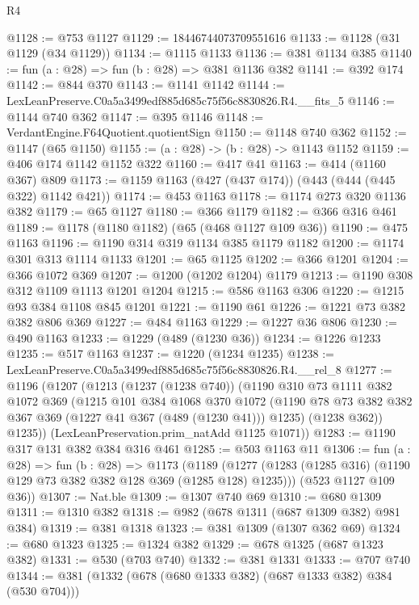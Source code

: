 \begin{lexlean}{R4}
\begin{coremodule}
@1128 := @753 @1127
@1129 := 18446744073709551616
@1133 := @1128 (@31 @1129 (@34 @1129))
@1134 := @1115 @1133
@1136 := @381 @1134 @385
@1140 := fun (a : @28) => fun (b : @28) => @381 @1136 @382
@1141 := @392 @174
@1142 := @844 @370
@1143 := @1141 @1142
@1144 := LexLeanPreserve.C0a5a3499edf885d685c75f56c8830826.R4.__fits_5
@1146 := @1144 @740 @362
@1147 := @395 @1146
@1148 := VerdantEngine.F64Quotient.quotientSign
@1150 := @1148 @740 @362
@1152 := @1147 (@65 @1150)
@1155 := (a : @28) -> (b : @28) -> @1143 @1152
@1159 := @406 @174 @1142 @1152 @322
@1160 := @417 @41
@1163 := @414 (@1160 @367) @809
@1173 := @1159 @1163 (@427 (@437 @174)) (@443 (@444 (@445 @322) @1142 @421))
@1174 := @453 @1163
@1178 := @1174 @273 @320 @1136 @382
@1179 := @65 @1127
@1180 := @366 @1179
@1182 := @366 @316 @461
@1189 := @1178 (@1180 @1182) (@65 (@468 @1127 @109 @36))
@1190 := @475 @1163
@1196 := @1190 @314 @319 @1134 @385 @1179 @1182
@1200 := @1174 @301 @313 @1114 @1133
@1201 := @65 @1125
@1202 := @366 @1201
@1204 := @366 @1072 @369
@1207 := @1200 (@1202 @1204) @1179
@1213 := @1190 @308 @312 @1109 @1113 @1201 @1204
@1215 := @586 @1163 @306
@1220 := @1215 @93 @384 @1108 @845 @1201
@1221 := @1190 @61
@1226 := @1221 @73 @382 @382 @806 @369
@1227 := @484 @1163
@1229 := @1227 @36 @806
@1230 := @490 @1163
@1233 := @1229 (@489 (@1230 @36))
@1234 := @1226 @1233
@1235 := @517 @1163
@1237 := @1220 (@1234 @1235)
@1238 := LexLeanPreserve.C0a5a3499edf885d685c75f56c8830826.R4.__rel_8
@1277 := @1196
    (@1207
      (@1213
        (@1237 (@1238 @740))
        (@1190
          @310
          @73
          @1111
          @382
          @1072
          @369
          (@1215
            @101
            @384
            @1068
            @370
            @1072
            (@1190 @78 @73 @382 @382 @367 @369 (@1227 @41 @367 (@489 (@1230 @41))) @1235)
            (@1238 @362))
          @1235))
      (LexLeanPreservation.prim_natAdd @1125 @1071))
@1283 := @1190 @317 @131 @382 @384 @316 @461
@1285 := @503 @1163 @11
@1306 := fun (a : @28) =>
  fun (b : @28) =>
  @1173
    (@1189
      (@1277 (@1283 (@1285 @316) (@1190 @129 @73 @382 @382 @128 @369 (@1285 @128) @1235)))
      (@523 @1127 @109 @36))
@1307 := Nat.ble
@1309 := @1307 @740 @69
@1310 := @680 @1309
@1311 := @1310 @382
@1318 := @982 (@678 @1311 (@687 @1309 @382) @981 @384)
@1319 := @381 @1318
@1323 := @381 @1309 (@1307 @362 @69)
@1324 := @680 @1323
@1325 := @1324 @382
@1329 := @678 @1325 (@687 @1323 @382)
@1331 := @530 (@703 @740)
@1332 := @381 @1331
@1333 := @707 @740
@1344 := @381 (@1332 (@678 (@680 @1333 @382) (@687 @1333 @382) @384 (@530 @704)))

\end{coremodule}
\end{lexlean}
